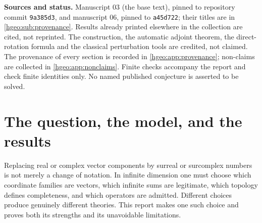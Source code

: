 \documentclass[11pt,letterpaper]{article}
\numberwithin{equation}{section}
\theoremstyle{definition}
\theoremstyle{remark}
\begin{document}
\begin{titlepage}
\begin{minipage}{.96\textwidth}
\begin{abstract}
A positive counterpart: every positive-order Hahn perturbation of an
ordinary Fredholm operator has an adjointable Moore--Penrose inverse, and a
finite Schur matrix determines its kernel, cokernel, index and exact inverse
valuation. Adjointable operators on the class of all surcomplex vectors have
one set-sized support.

This report merges two independently written manuscripts; it says which
source proved each result, prints shared results once, and keeps every
source's limitations. It is an AI-assisted draft: it has not been refereed,
and nothing in it has been formalized in Lean.
\end{abstract}
\end{minipage}
\vfill
\begin{minipage}{.96\textwidth}\small
\textbf{Sources and status.} Manuscript 03 (the base text), pinned to
repository commit \texttt{9a385d3}, and manuscript 06, pinned to
\texttt{a45d722}; their titles are in \cref{hgeo:sub:provenance}. Results
already printed elsewhere in the collection are cited, not reprinted. The
construction, the automatic adjoint theorem, the direct-rotation formula and
the classical perturbation tools are credited, not claimed. The provenance of
every section is recorded in \cref{hgeo:app:provenance}; non-claims are
collected in \cref{hgeo:app:nonclaims}. Finite checks accompany the report
and check finite identities only. No named published conjecture is asserted
to be solved.
\end{minipage}
\end{titlepage}
\hypersetup{pageanchor=true}
\setcounter{tocdepth}{2}
\tableofcontents
\clearpage
{}

\section{The question, the model, and the results}
\label{hgeo:sec:intro}

Replacing real or complex vector components by surreal or surcomplex
numbers is not merely a change of notation. In infinite dimension one
must choose which coordinate families are vectors, which infinite sums
are legitimate, which topology defines completeness, and which operators
are admitted. Different choices produce genuinely different theories. This
report makes one such choice and proves both its strengths and its
unavoidable limitations.
\end{document}
